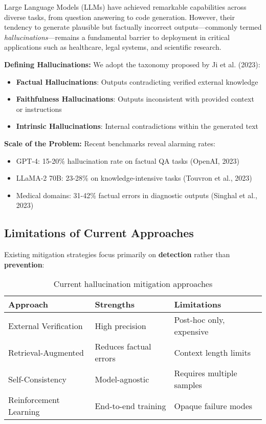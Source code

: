\documentclass[11pt]{article}
\begin{document}
Large Language Models (LLMs) have achieved remarkable capabilities across diverse tasks, from question answering to code generation. However, their tendency to generate plausible but factually incorrect outputs---commonly termed \textit{hallucinations}---remains a fundamental barrier to deployment in critical applications such as healthcare, legal systems, and scientific research.

\textbf{Defining Hallucinations:} We adopt the taxonomy proposed by Ji et al. (2023):

\begin{itemize}
    \item \textbf{Factual Hallucinations}: Outputs contradicting verified external knowledge
    \item \textbf{Faithfulness Hallucinations}: Outputs inconsistent with provided context or instructions
    \item \textbf{Intrinsic Hallucinations}: Internal contradictions within the generated text
\end{itemize}

\textbf{Scale of the Problem:} Recent benchmarks reveal alarming rates:
\begin{itemize}
    \item GPT-4: 15-20\% hallucination rate on factual QA tasks (OpenAI, 2023)
    \item LLaMA-2 70B: 23-28\% on knowledge-intensive tasks (Touvron et al., 2023)
    \item Medical domains: 31-42\% factual errors in diagnostic outputs (Singhal et al., 2023)
\end{itemize}

\subsection{Limitations of Current Approaches}

Existing mitigation strategies focus primarily on \textbf{detection} rather than \textbf{prevention}:

\begin{table}[H]
\centering
\begin{tabular}{@{}lll@{}}
\toprule
\textbf{Approach} & \textbf{Strengths} & \textbf{Limitations} \\ \midrule
External Verification & High precision & Post-hoc only, expensive \\
Retrieval-Augmented & Reduces factual errors & Context length limits \\
Self-Consistency & Model-agnostic & Requires multiple samples \\
Reinforcement Learning & End-to-end training & Opaque failure modes \\ \bottomrule
\end{tabular}
\caption{Current hallucination mitigation approaches}
\end{table}
\end{document}
